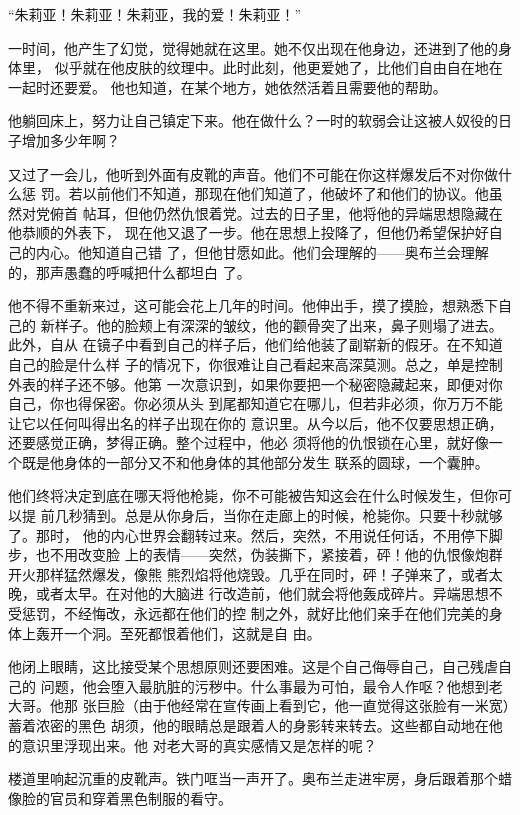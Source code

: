 ``朱莉亚！朱莉亚！朱莉亚，我的爱！朱莉亚！''

一时间，他产生了幻觉，觉得她就在这里。她不仅出现在他身边，还进到了他的身体里，
似乎就在他皮肤的纹理中。此时此刻，他更爱她了，比他们自由自在地在一起时还要爱。
他也知道，在某个地方，她依然活着且需要他的帮助。

他躺回床上，努力让自己镇定下来。他在做什么？一时的软弱会让这被人奴役的日子增加多少年啊？

又过了一会儿，他听到外面有皮靴的声音。他们不可能在你这样爆发后不对你做什么惩
罚。若以前他们不知道，那现在他们知道了，他破坏了和他们的协议。他虽然对党俯首
帖耳，但他仍然仇恨着党。过去的日子里，他将他的异端思想隐藏在他恭顺的外表下，
现在他又退了一步。他在思想上投降了，但他仍希望保护好自己的内心。他知道自己错
了，但他甘愿如此。他们会理解的——奥布兰会理解的，那声愚蠢的呼喊把什么都坦白
了。

他不得不重新来过，这可能会花上几年的时间。他伸出手，摸了摸脸，想熟悉下自己的
新样子。他的脸颊上有深深的皱纹，他的颧骨突了出来，鼻子则塌了进去。此外，自从
在镜子中看到自己的样子后，他们给他装了副崭新的假牙。在不知道自己的脸是什么样
子的情况下，你很难让自己看起来高深莫测。总之，单是控制外表的样子还不够。他第
一次意识到，如果你要把一个秘密隐藏起来，即便对你自己，你也得保密。你必须从头
到尾都知道它在哪儿，但若非必须，你万万不能让它以任何叫得出名的样子出现在你的
意识里。从今以后，他不仅要思想正确，还要感觉正确，梦得正确。整个过程中，他必
须将他的仇恨锁在心里，就好像一个既是他身体的一部分又不和他身体的其他部分发生
联系的圆球，一个囊肿。

他们终将决定到底在哪天将他枪毙，你不可能被告知这会在什么时候发生，但你可以提
前几秒猜到。总是从你身后，当你在走廊上的时候，枪毙你。只要十秒就够了。那时，
他的内心世界会翻转过来。然后，突然，不用说任何话，不用停下脚步，也不用改变脸
上的表情——突然，伪装撕下，紧接着，砰！他的仇恨像炮群开火那样猛然爆发，像熊
熊烈焰将他烧毁。几乎在同时，砰！子弹来了，或者太晚，或者太早。在对他的大脑进
行改造前，他们就会将他轰成碎片。异端思想不受惩罚，不经悔改，永远都在他们的控
制之外，就好比他们亲手在他们完美的身体上轰开一个洞。至死都恨着他们，这就是自
由。

他闭上眼睛，这比接受某个思想原则还要困难。这是个自己侮辱自己，自己残虐自己的
问题，他会堕入最肮脏的污秽中。什么事最为可怕，最令人作呕？他想到老大哥。他那
张巨脸（由于他经常在宣传画上看到它，他一直觉得这张脸有一米宽）蓄着浓密的黑色
胡须，他的眼睛总是跟着人的身影转来转去。这些都自动地在他的意识里浮现出来。他
对老大哥的真实感情又是怎样的呢？

楼道里响起沉重的皮靴声。铁门哐当一声开了。奥布兰走进牢房，身后跟着那个蜡像脸的官员和穿着黑色制服的看守。

